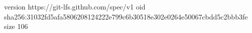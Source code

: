 version https://git-lfs.github.com/spec/v1
oid sha256:31032fd5afa5806208124222e799c6b30518e302e0264e50067cbdd5c2bbb3fe
size 106
